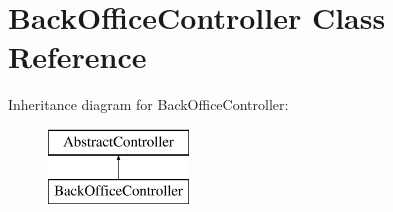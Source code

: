 \hypertarget{class_app_1_1_controller_1_1_back_office_controller}{}\section{Back\+Office\+Controller Class Reference}
\label{class_app_1_1_controller_1_1_back_office_controller}
Inheritance diagram for Back\+Office\+Controller\+:\begin{figure}[H]
\begin{center}
\leavevmode
\includegraphics[height=2.000000cm]{class_app_1_1_controller_1_1_back_office_controller}
\end{center}
\end{figure}
